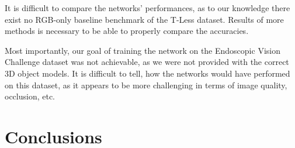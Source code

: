 It is difficult to compare the networks' performances, as to our knowledge there exist no RGB-only baseline benchmark of the T-Less dataset. Results of more methods is necessary to be able to properly compare the accuracies.

Most importantly, our goal of training the network on the Endoscopic Vision Challenge dataset was not achievable, as we were not provided with the correct 3D object models. It is difficult to tell, how the networks would have performed on this dataset, as it appears to be more challenging in terms of image quality, occlusion, etc.

\section{Conclusions}


